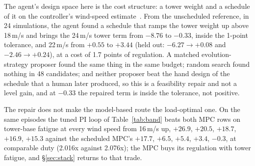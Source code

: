 \documentclass{article}
\begin{document}
The agent's design space here is the cost structure: a tower weight and a schedule of it on the controller's wind-speed estimate~\citep{Wintermeyer2021weightsched}. From the unscheduled reference, in 24 simulations, the agent found a schedule that ramps the tower weight up above 18\,m/s and brings the 24\,m/s tower term from $-8.76$ to $-0.33$, inside the 1-point tolerance, and 22\,m/s from $+0.55$ to $+3.44$ (held out: $-6.27\to+0.08$ and $-2.46\to+0.24$), at a cost of 1.7 points of regulation. A matched evolution-strategy proposer found the same thing in the same budget; random search found nothing in 48 candidates; and neither proposer beat the hand design of the schedule that a human later produced, so this is a feasibility repair and not a level gain, and at $-0.33$ the repaired term is inside the tolerance, not positive.

\begin{table}[t]
\centering\small
\caption{Leg 2: the offset-free LPV-MPC without and with the agent-found tower-weight schedule, fresh seeds, four reductions against the paired shipped controller, the paired difference between the two rows, and the tower-base DEL reduction per mean wind speed from 16\,m/s up. The set mean of the tower term understates the repair by an order of magnitude.}
\label{tab:mpc}
\end{table}

The repair does not make the model-based route the load-optimal one. On the same episodes the tuned PI loop of Table~\ref{tab:band} beats both MPC rows on tower-base fatigue at every wind speed from 16\,m/s up, $+26.9$, $+20.5$, $+18.7$, $+16.9$, $+15.3$ against the scheduled MPC's $+17.7$, $+6.5$, $+5.4$, $+3.4$, $-0.3$, at comparable duty (2.016x against 2.076x); the MPC buys its regulation with tower fatigue, and §\ref{sec:stack} returns to that trade.
\end{document}
